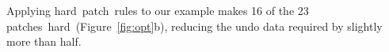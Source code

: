 \documentclass[9pt,twocolumn,letterpaper]{article}
\newcommand{\Kudos}{Featherstitch}
\newcommand{\patch}{patch}
\newcommand{\patches}{patches}
\newcommand{\nrb}{hard}
\begin{document}
\begin{comment}
\Kudos\ further ensures that the dependency structure correctly
represents dependencies on the same block through overlap
dependencies: since \nrb\ \patches\ are considered to cover the entire
block, every succeeding \patch\ will overlap at least one \nrb\ \patch,
and \Kudos\ will automatically add a dependency.
%
(Some cases are handled by other optimizations.)


The buffer cache's ``write block'' behavior must account for \nrb\
\patches, as it \emph{must} write any \nrb\ \patches\ that exist on a
block.
%
Let $\PHard[b]$ be the set of \nrb\ \patches\ on block $b$.
%
Then to write block $b$, the buffer cache must choose some $P \subseteq
\PMem[b]$ with
%
\[ \PDepset{P} \subseteq P \cup \PDisk \text{ and } \PHard[b] \cap \PMem
\subseteq P. \]
%
If no such $P$ exists, then the cache must write a different block.
\end{comment}


Applying \nrb\ \patch\ rules to our example makes 16 of the 23 \patches\ \nrb\
(Figure~\ref{fig:opt}b),
%
reducing the undo data required by slightly more than half.
\end{document}

